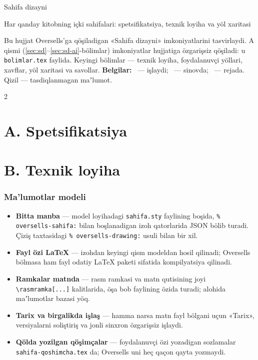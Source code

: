 \documentclass[11pt]{article}
\newcommand\holatbelgi[2]{\tcbox[on line,boxsep=0pt,left=2.5pt,right=2.5pt,top=1pt,bottom=1pt,colback=#1!12,colframe=#1,boxrule=0.4pt,arc=2pt]{\scriptsize\textbf{\color{#1!75!black}#2}}}
\newcommand\tayyor{\holatbelgi{yashil}{tayyor}}
\renewcommand\beta{\holatbelgi{urgu}{beta}}
\newcommand\reja{\holatbelgi{kulrang}{reja}}
\newcommand\tekshir[1]{\leavevmode{\color{qizil}\small[TEKSHIRILSIN: #1]}}
\begin{document}
\begin{tcolorbox}[colback=asosiy,colframe=asosiy,arc=3mm,left=6mm,right=6mm,top=4mm,bottom=4mm]
\color{white}
{\titlefont\fontsize{26}{30}\selectfont Sahifa dizayni}\par\medskip
{\large Har qanday kitobning içki sahifalari: spetsifikatsiya, texnik loyiha va yöl xaritasi}
\end{tcolorbox}

Bu hujjat Oversells'ga qöşiladigan «Sahifa dizayni» imkoniyatlarini tasvirlaydi. A qismi (\ref{sec:sd}--\ref{sec:sd-ai}-bölimlar) imkoniyatlar hujjatiga özgarişsiz qöşiladi: u \texttt{bolimlar.tex} faylida. Keyingi bölimlar --- texnik loyiha, foydalanuvçi yöllari, xavflar, yöl xaritasi va savollar.
\textbf{Belgilar:} \tayyor\ --- işlaydi; \beta\ --- sinovda; \reja\ --- rejada. Qizil \tekshir{...} --- tasdiqlanmagan maʼlumot.

\begin{multicols}{2}\small
\tableofcontents
\end{multicols}

\part*{A. Spetsifikatsiya}


\part*{B. Texnik loyiha}
\section{Ma’lumotlar modeli}\label{sec:tl-model}
\begin{itemize}
\item \textbf{Bitta manba} --- model loyihadagi \texttt{sahifa.sty} faylining boşida, \texttt{\% oversells-sahifa:} bilan boşlanadigan izoh qatorlarida JSON bölib turadi. Çiziş taxtasidagi \texttt{\% oversells-drawing:} usuli bilan bir xil.
\item \textbf{Fayl özi LaTeX} --- izohdan keyingi qism modeldan hosil qilinadi; Oversells bölmasa ham fayl odatiy LaTeX paketi sifatida kompilyatsiya qilinadi.
\item \textbf{Ramkalar matnda} --- rasm ramkasi va matn qutisining joyi \texttt{\textbackslash rasmramka[...]} kalitlarida, öşa bob faylining özida turadi; alohida maʼlumotlar bazasi yöq.
\item \textbf{Tarix va birgalikda işlaş} --- hamma narsa matn fayl bölgani uçun «Tarix», versiyalarni soliştiriş va jonli sinxron özgarişsiz işlaydi.
\item \textbf{Qölda yozilgan qöşimçalar} --- foydalanuvçi özi yozadigan sozlamalar \texttt{sahifa-qoshimcha.tex} da; Oversells uni heç qaçon qayta yozmaydi.
\end{itemize}
\end{document}
